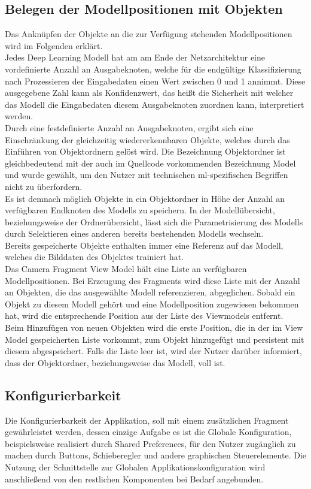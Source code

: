\documentclass[oneside]{ausarbeitung}
\begin{document}
\subsection{Belegen der Modellpositionen mit Objekten}
Das Anknüpfen der Objekte an die zur Verfügung stehenden Modellpositionen wird im Folgenden erklärt.\\
Jedes Deep Learning Modell hat am am Ende der Netzarchitektur eine vordefinierte Anzahl an Ausgabeknoten, welche für die endgültige Klassifizierung nach Prozessieren der Eingabedaten einen Wert zwischen 0 und 1 annimmt. Diese ausgegebene Zahl kann als Konfidenzwert, das heißt die Sicherheit mit welcher das Modell die Eingabedaten diesem Ausgabeknoten zuordnen kann, interpretiert werden.\\
Durch eine festdefinierte Anzahl an Ausgabeknoten, ergibt sich eine Einschränkung der gleichzeitig wiedererkennbaren Objekte, welches durch das Einführen von Objektordnern gelöst wird. Die Bezeichnung Objektordner ist gleichbedeutend mit der auch im Quellcode vorkommenden Bezeichnung Model und wurde gewählt, um den Nutzer mit technischen \ac{ml}-spezifischen Begriffen nicht zu überfordern.\\
Es ist demnach möglich Objekte in ein Objektordner in Höhe der Anzahl an verfügbaren Endknoten des Modells zu speichern. In der Modellübersicht, beziehungsweise der Ordnerübersicht, lässt sich die Parametrisierung des Modells durch Selektieren eines anderen bereits bestehenden Modells wechseln.\\
Bereits gespeicherte Objekte enthalten immer eine Referenz auf das Modell, welches die Bilddaten des Objektes trainiert hat.\\
Das Camera Fragment View Model hält eine Liste an verfügbaren Modellpositionen. Bei Erzeugung des Fragments wird diese Liste mit der Anzahl an Objekten, die das ausgewählte Modell referenzieren, abgeglichen. Sobald ein Objekt zu diesem Modell gehört und eine Modellposition zugewiesen bekommen hat, wird die entsprechende Position aus der Liste des Viewmodels entfernt.\\
Beim Hinzufügen von neuen Objekten wird die erste Position, die in der im View Model gespeicherten Liste vorkommt, zum Objekt hinzugefügt und persistent mit diesem abgespeichert. Falls die Liste leer ist, wird der Nutzer darüber informiert, dass der Objektordner, beziehungsweise das Modell, voll ist.
\subsection{Konfigurierbarkeit}
Die Konfigurierbarkeit der Applikation, soll mit einem zusätzlichen Fragment gewährleistet werden, dessen einzige Aufgabe es ist die Globale Konfiguration, beispielsweise realisiert durch Shared Preferences, für den Nutzer zugänglich zu machen durch Buttons, Schieberegler und andere graphischen Steuerelemente. Die Nutzung der Schnittstelle zur Globalen Applikationskonfiguration wird anschließend von den restlichen Komponenten bei Bedarf angebunden.
\end{document}
